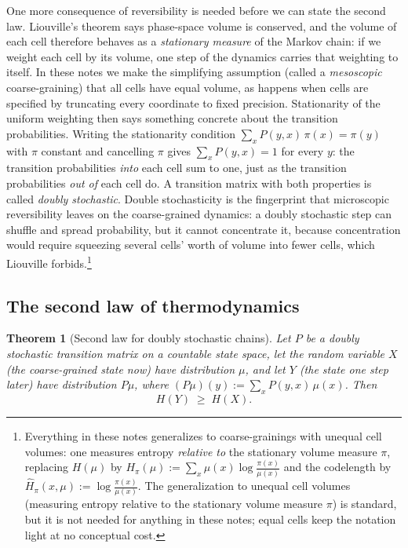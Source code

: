\documentclass[10pt]{article}
\newtheorem{theorem}{Theorem}[section]
\theoremstyle{definition}
\theoremstyle{remark}
\begin{document}
One more consequence of reversibility is needed before we can state the second law. Liouville's theorem says phase-space volume is conserved, and the volume of each cell therefore behaves as a \emph{stationary measure} of the Markov chain: if we weight each cell by its volume, one step of the dynamics carries that weighting to itself. In these notes we make the simplifying assumption (called a \emph{mesoscopic} coarse-graining) that all cells have equal volume, as happens when cells are specified by truncating every coordinate to fixed precision. Stationarity of the uniform weighting then says something concrete about the transition probabilities. Writing the stationarity condition $\sum_x P(y,x)\,\pi(x) = \pi(y)$ with $\pi$ constant and cancelling $\pi$ gives $\sum_x P(y, x) = 1$ for every $y$: the transition probabilities \emph{into} each cell sum to one, just as the transition probabilities \emph{out of} each cell do. A transition matrix with both properties is called \emph{doubly stochastic}. Double stochasticity is the fingerprint that microscopic reversibility leaves on the coarse-grained dynamics: a doubly stochastic step can shuffle and spread probability, but it cannot concentrate it, because concentration would require squeezing several cells' worth of volume into fewer cells, which Liouville forbids.\footnote{Everything in these notes generalizes to coarse-grainings with unequal cell volumes: one measures entropy \emph{relative to} the stationary volume measure $\pi$, replacing $H(\mu)$ by $H_\pi(\mu) := \sum_x \mu(x) \log \frac{\pi(x)}{\mu(x)}$ and the codelength by $\hat H_\pi(x,\mu) := \log\frac{\pi(x)}{\mu(x)}$. The generalization to unequal cell volumes (measuring entropy relative to the stationary volume measure $\pi$) is standard, but it is not needed for anything in these notes; equal cells keep the notation light at no conceptual cost.}

\subsection{The second law of thermodynamics}
\label{sec:secondlawproof}

\begin{theorem}[Second law for doubly stochastic chains]
\label{thm:secondlaw}
Let $P$ be a doubly stochastic transition matrix on a countable state space, let the random variable $X$ (the coarse-grained state now) have distribution $\mu$, and let $Y$ (the state one step later) have distribution $P\mu$, where $(P\mu)(y) := \sum_x P(y,x)\,\mu(x)$. Then
\[
H(Y) \;\ge\; H(X).
\]
\end{theorem}
\end{document}
